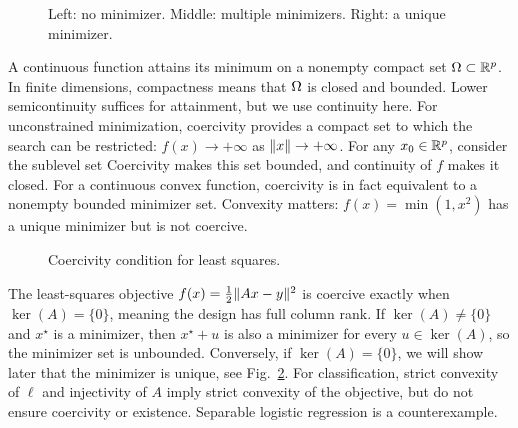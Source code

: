 \begin{figure}[tbp]
\centering
{}
\caption{Left: no minimizer. Middle: multiple minimizers. Right: a unique minimizer.}
\label{fig-minimizer-exists}
\end{figure}

A continuous function attains its minimum on a nonempty compact set $\Omega\subset\mathbb{R}^p$. In finite dimensions, compactness means that $\Omega$ is closed and bounded. Lower semicontinuity suffices for attainment, but we use continuity here. For unconstrained minimization, coercivity provides a compact set to which the search can be restricted: $f(x) \rightarrow +\infty$ as $\lVert x\rVert\rightarrow+\infty$. For any $x_0 \in \mathbb{R}^p$, consider the sublevel set
Coercivity makes this set bounded, and continuity of $f$ makes it closed. For a continuous convex function, coercivity is in fact equivalent to a nonempty bounded minimizer set. Convexity matters: $f(x)=\min(1,x^2)$ has a unique minimizer but is not coercive.

\begin{figure}[tbp]
\centering
{}\hfill
{}
\caption{Coercivity condition for least squares.}
\label{fig-least-square}
\end{figure}

\begin{exmp}
The least-squares objective $f(x)=\frac{1}{2}\lVert Ax-y\rVert^2$ is coercive exactly when $\ker(A)=\{0\}$, meaning the design has full column rank. If $\ker(A) \neq \{0\}$ and $x^\star$ is a minimizer, then $x^\star+u$ is also a minimizer for every $u \in \ker(A)$, so the minimizer set is unbounded.
%
Conversely, if $\ker(A) = \{0\}$, we will show later that the minimizer is unique, see Fig.~\ref{fig-least-square}.
%
For classification, strict convexity of $\ell$ and injectivity of $A$ imply strict convexity of the objective, but do not ensure coercivity or existence. Separable logistic regression is a counterexample.
\end{exmp}

